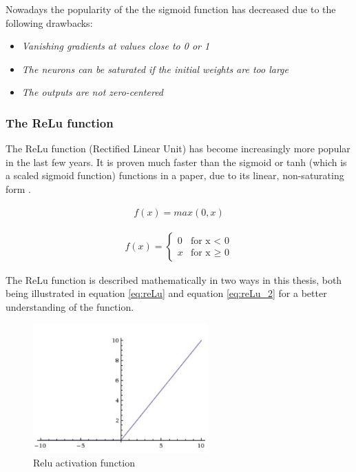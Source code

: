 \documentclass[USenglish]{ifimaster}  %
\begin{document}
Nowadays the popularity of the the sigmoid function has decreased due to the following drawbacks:
\begin{itemize}
    \item \textit{Vanishing gradients at values close to 0 or 1}
    \item \textit{The neurons can be saturated if the initial weights are too large}
    \item \textit{The outputs are not zero-centered}
\end{itemize}

\subsubsection{The ReLu function}
The ReLu function (Rectified Linear Unit) has become increasingly more popular in the last few years. It is proven much faster than the sigmoid or tanh (which is a scaled sigmoid function) functions in a paper, due to its linear, non-saturating form \cite{website:relu}. 

\begin{equation}\label{eq:reLu}
\begin{aligned}
f(x) = max(0,x)
\end{aligned}
\end{equation}

\begin{equation}\label{eq:reLu_2}
\begin{aligned}
{f(x) = 
\begin{cases}
    0 & \text{for x < 0}  \\
    x & \text{for x $\geq$ 0}
\end{cases}}
\end{aligned}
\end{equation}

The ReLu function is described mathematically in two ways in this thesis, both being illustrated in equation \ref{eq:reLu} and equation \ref{eq:reLu_2} for a better understanding of the function.

\begin{figure}[ht]
    \centering
    \includegraphics[width=0.6\textwidth]{bilder/relu_activation.png}
    \caption{Relu activation function \cite{website:cs231n_activation_functions}}
    \label{fig:relu}
\end{figure}
\end{document}
